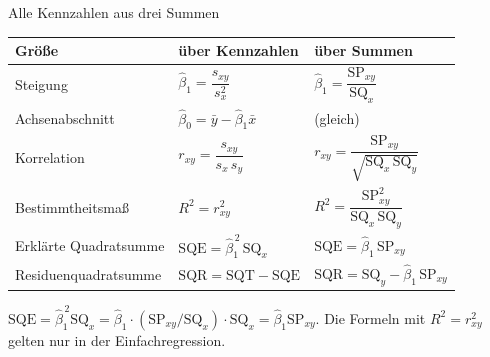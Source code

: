 \documentclass[aspectratio=169,11pt]{beamer}
\newcommand{\SQx}{\text{SQ}_x}
\newcommand{\SQy}{\text{SQ}_y}
\newcommand{\SPxy}{\text{SP}_{xy}}
\begin{document}
\begin{frame}{Alle Kennzahlen aus drei Summen}
  \begin{center}
    \renewcommand{\arraystretch}{1.55}
    \begin{tabular}{@{}l l l@{}}
      \toprule
      \textbf{Größe} & \textbf{über Kennzahlen} & \textbf{über Summen} \\
      \midrule
      Steigung              & $\hat{\beta}_1 = \dfrac{s_{xy}}{s_x^{2}}$       & $\hat{\beta}_1 = \dfrac{\SPxy}{\SQx}$ \\
      Achsenabschnitt       & $\hat{\beta}_0 = \bar{y} - \hat{\beta}_1 \bar{x}$ & (gleich) \\
      Korrelation           & $r_{xy} = \dfrac{s_{xy}}{s_x\,s_y}$             & $r_{xy} = \dfrac{\SPxy}{\sqrt{\SQx\,\SQy}}$ \\[8pt]
      Bestimmtheitsmaß      & $R^{2} = r_{xy}^{2}$                            & $R^{2} = \dfrac{\SPxy^{2}}{\SQx\,\SQy}$ \\
      Erklärte Quadratsumme & $\text{SQE} = \hat{\beta}_1^{\,2}\,\SQx$     & $\text{SQE} = \hat{\beta}_1\,\SPxy$ \\
      Residuenquadratsumme  & $\text{SQR} = \text{SQT} - \text{SQE}$   & $\text{SQR} = \SQy - \hat{\beta}_1\,\SPxy$ \\
      \bottomrule
    \end{tabular}
  \end{center}
  \footnotesize $\text{SQE} = \hat{\beta}_1^{\,2}\SQx = \hat{\beta}_1 \cdot (\SPxy/\SQx) \cdot \SQx = \hat{\beta}_1 \SPxy$.
  Die Formeln mit $R^{2} = r_{xy}^{2}$ gelten nur in der Einfachregression.
\end{frame}
\end{document}
